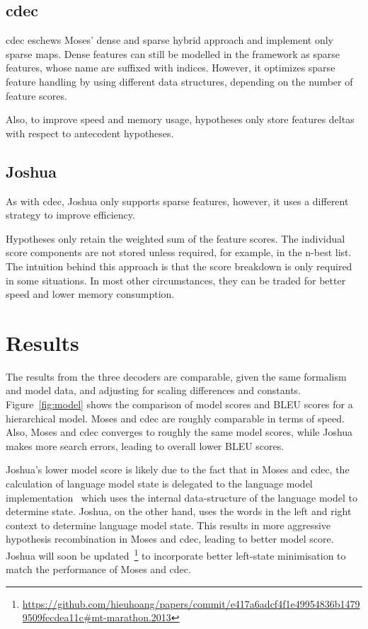 \documentclass{pbml}
\begin{document}
\subsection{cdec}
cdec eschews Moses' dense and sparse hybrid approach and implement only sparse maps. Dense features can still be modelled in the framework as sparse features, whose name are suffixed with indices. However, it optimizes sparse feature handling by using different data structures, depending on the number of feature scores.

Also, to improve speed and memory usage, hypotheses only store features deltas with respect to antecedent hypotheses.

\subsection{Joshua}
As with cdec, Joshua only supports sparse features, however, it uses a different strategy to improve efficiency.

Hypotheses only retain the weighted sum of the feature scores. The individual score components are not stored unless required, for example, in the n-best list. The intuition behind this approach is that the score breakdown is only required in some situations. In most other circumstances, they can be traded for better speed and lower memory consumption.
  
\section{Results}

The results from the three decoders are comparable, given the same formalism and model data, and adjusting for scaling differences and constants. Figure~\ref{fig:model} shows the comparison of model scores and BLEU scores for a hierarchical model. Moses and cdec are roughly comparable in terms of speed. Also, Moses and cdec converges to roughly the same model scores, while Joshua makes more search errors, leading to overall lower BLEU scores.

Joshua's lower model score is likely due to the fact that in Moses and cdec, the calculation of language model state is delegated to the language model implementation~\cite{Heafield-left} which uses the internal data-structure of the language model to determine state. Joshua, on the other hand, uses the words in the left and right context to determine language model state. This results in more aggressive hypothesis recombination in Moses and cdec, leading to better model score. Joshua will soon be updated~\footnote{\url{https://github.com/hieuhoang/papers/commit/e417a6adcf4f1e49954836b14799509fecdea11c#mt-marathon.2013} } to incorporate better left-state minimisation to match the performance of Moses and cdec. 
\end{document}
